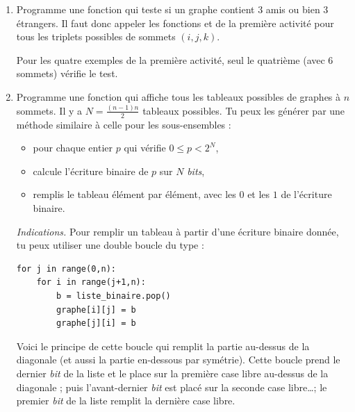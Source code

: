 \documentclass[11pt,class=report,crop=false]{standalone}
\begin{document}
\begin{activite}[Théorème de Ramsey pour $n=6$]


\begin{enumerate}
  \item Programme une fonction  qui teste si un graphe contient $3$ amis ou bien $3$ étrangers. Il faut donc appeler les fonctions  et  de la première activité pour tous les triplets possibles de sommets $(i,j,k)$.
 
 Pour les quatre exemples de la première activité, seul le quatrième (avec $6$ sommets) vérifie le test.
  
  \item Programme une fonction  qui affiche tous les tableaux possibles de graphes à $n$ sommets.
  Il y a $N = \frac{(n-1)n}{2}$ tableaux possibles. Tu peux les générer par une méthode similaire à celle pour les sous-ensembles :
  \begin{itemize}
    \item pour chaque entier $p$ qui vérifie $0 \le p < 2^N$,
    \item calcule l'écriture binaire de $p$ sur $N$ \emph{bits},
    \item remplis le tableau élément par élément, avec les $0$ et les $1$ de l'écriture binaire.
  \end{itemize}


\emph{Indications.}
Pour remplir un tableau à partir d'une écriture binaire  donnée, tu peux utiliser une double boucle du type :

\begin{lstlisting}
for j in range(0,n):
    for i in range(j+1,n):
        b = liste_binaire.pop()
        graphe[i][j] = b
        graphe[j][i] = b
\end{lstlisting}
  
Voici le principe de cette boucle qui remplit la partie au-dessus de la diagonale (et aussi la partie en-dessous par symétrie).
Cette boucle prend le dernier \emph{bit} de la liste et le place sur la première case libre au-dessus de la diagonale ; puis l'avant-dernier \emph{bit} est placé sur la seconde case libre\ldots ; le premier \emph{bit} de la liste remplit la dernière case libre.



\end{enumerate}
\end{activite}
\end{document}
